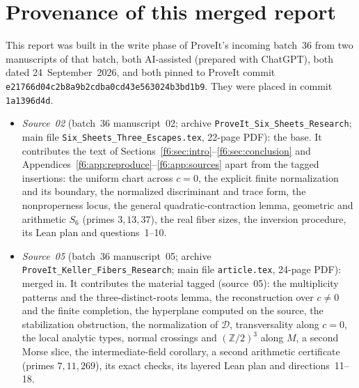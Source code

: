 \documentclass[11pt,a4paper]{article}
\theoremstyle{definition}
\newcommand{\Z}{\mathbb Z}
\newcommand{\code}[1]{\texttt{\nolinkurl{#1}}}
\newcommand{\dd}{\mathcal D}
\newcommand{\src}[1]{\textup{(source~#1)}}
\begin{document}
\section{Provenance of this merged report}
\label{f6:app:provenance}
This report was built in the write phase of ProveIt's incoming batch~36 from
two manuscripts of that batch, both AI-assisted (prepared with ChatGPT), both
dated 24~September~2026, and both pinned to ProveIt commit
\code{e21766d04c2b8a9b2cdba0cd43e563024b3bd1b9}. They were placed in commit
\code{1a1396d4d}.
\begin{itemize}
\item \emph{Source~02} (batch~36 manuscript~02; archive
\code{ProveIt_Six_Sheets_Research}; main file
\code{Six_Sheets_Three_Escapes.tex}, 22-page PDF): the base. It contributes
the text of Sections~\ref{f6:sec:intro}--\ref{f6:sec:conclusion} and
Appendices~\ref{f6:app:reproduce}--\ref{f6:app:sources} apart from the
tagged insertions: the uniform chart across $c=0$, the explicit finite
normalization and its boundary, the normalized discriminant and trace form,
the nonproperness locus, the general quadratic-contraction lemma, geometric
and arithmetic $S_6$ (primes $3,13,37$), the real fiber sizes, the inversion
procedure, its Lean plan and questions~1--10.
\item \emph{Source~05} (batch~36 manuscript~05; archive
\code{ProveIt_Keller_Fibers_Research}; main file \code{article.tex}, 24-page
PDF): merged in. It contributes the material tagged \src{05}: the multiplicity
patterns and the three-distinct-roots lemma, the reconstruction over $c\ne0$
and the finite completion, the hyperplane computed on the source, the
stabilization obstruction, the normalization of $\dd$, transversality along
$c=0$, the local analytic types, normal crossings and $(\Z/2)^3$ along $M$, a
second Morse slice, the intermediate-field corollary, a second arithmetic
certificate (primes $7,11,269$), its exact checks, its layered Lean plan and
directions~11--18.
\end{itemize}
\end{document}
